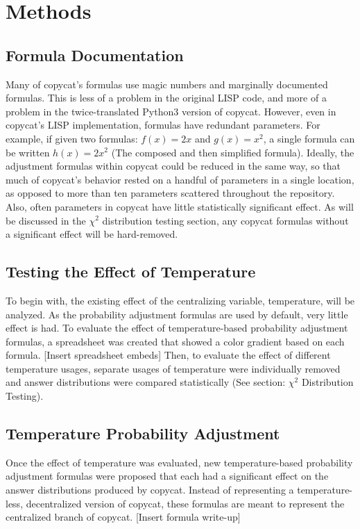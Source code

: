 \documentclass[a4paper]{article}
\begin{document}

\section{Methods}
    \subsection{Formula Documentation}
        Many of copycat's formulas use magic numbers and marginally documented formulas.
        This is less of a problem in the original LISP code, and more of a problem in the twice-translated Python3 version of copycat.
        However, even in copycat's LISP implementation, formulas have redundant parameters.
        For example, if given two formulas: $f(x) = 2x$ and $g(x) = x^2$, a single formula can be written $h(x) = 2x^2$ (The composed and then simplified formula).
        Ideally, the adjustment formulas within copycat could be reduced in the same way, so that much of copycat's behavior rested on a handful of parameters in a single location, as opposed to more than ten parameters scattered throughout the repository.
        Also, often parameters in copycat have little statistically significant effect.
        As will be discussed in the $\chi^2$ distribution testing section, any copycat formulas without a significant effect will be hard-removed.
    \subsection{Testing the Effect of Temperature}
        To begin with, the existing effect of the centralizing variable, temperature, will be analyzed.
        As the probability adjustment formulas are used by default, very little effect is had.
        To evaluate the effect of temperature-based probability adjustment formulas, a spreadsheet was created that showed a color gradient based on each formula.
        [Insert spreadsheet embeds]
        Then, to evaluate the effect of different temperature usages, separate usages of temperature were individually removed and answer distributions were compared statistically (See section: $\chi^2$ Distribution Testing).
    \subsection{Temperature Probability Adjustment}
        Once the effect of temperature was evaluated, new temperature-based probability adjustment formulas were proposed that each had a significant effect on the answer distributions produced by copycat.
        Instead of representing a temperature-less, decentralized version of copycat, these formulas are meant to represent the centralized branch of copycat.
        [Insert formula write-up]
\end{document}

